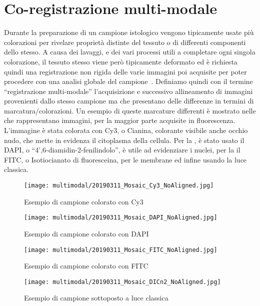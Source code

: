 \section{Co-registrazione multi-modale}
Durante la preparazione di un campione istologico vengono tipicamente usate più colorazioni per rivelare proprietà distinte del tessuto o di differenti componenti dello stesso. A causa dei lavaggi, e dei vari processi utili a completare ogni singola colorazione, il tessuto stesso viene però tipicamente deformato ed è richiesta quindi una registrazione non rigida delle varie immagini poi acquisite per poter procedere con una analisi globale del campione~\cite{9058666}.\hfill \break
\noindent Definiamo quindi con il termine ``registrazione multi-modale'' l'acquisizione e successivo allineamento di immagini provenienti dallo stesso campione ma che presentano delle differenze in termini di marcatura/colorazioni. Un esempio di queste marcature differenti è mostrato nelle  che rappresentano immagini, per la maggior parte acquisite in fluorescenza. L'immagine  è stata colorata con Cy3, o Cianina, colorante visibile anche occhio nudo, che mette in evidenza il citoplasma della cellula.
Per la , è stato usato il DAPI, o ``4',6-diamidin-2-fenilindolo'', è utile ad evidenziare i nuclei, per la  il FITC, o Isotiocianato di fluoresceina, per le membrane ed infine  usando la luce classica. \par
\noindent 
\begin{figure}[H]
    \centering
    \texttt{[image: multimodal/20190311\_Mosaic\_Cy3\_NoAligned.jpg]}
    \caption{Esempio di campione colorato con Cy3}
    \label{fig:1}
\end{figure}
\begin{figure}[H]
    \centering
    \texttt{[image: multimodal/20190311\_Mosaic\_DAPI\_NoAligned.jpg]}
    \caption{Esempio di campione colorato con DAPI}
    \label{fig:2}
\end{figure}
\begin{figure}[H]
    \centering
    \texttt{[image: multimodal/20190311\_Mosaic\_FITC\_NoAligned.jpg]}
    \caption{Esempio di campione colorato con FITC}
    \label{fig:3}
\end{figure}
\begin{figure}[H]
    \centering
    \texttt{[image: multimodal/20190311\_Mosaic\_DICn2\_NoAligned.jpg]}
    \caption{Esempio di campione sottoposto a luce classica}
    \label{fig:4}
\end{figure}
